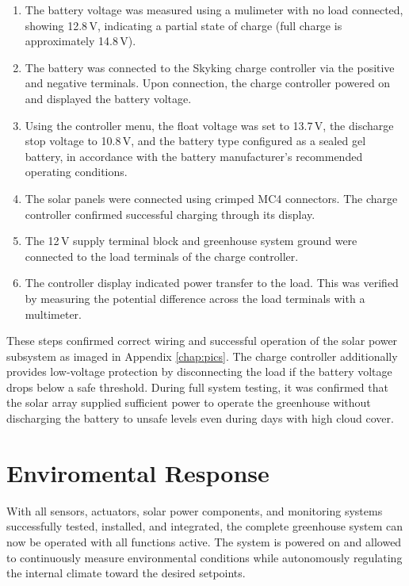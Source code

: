 \begin{enumerate}
	\item The battery voltage was measured using a mulimeter with no load connected, showing 12.8\,V, indicating a partial state of charge (full charge is approximately 14.8\,V).  
	\item The battery was connected to the Skyking charge controller via the positive and negative terminals. Upon connection, the charge controller powered on and displayed the battery voltage.  
	\item Using the controller menu, the float voltage was set to 13.7\,V, the discharge stop voltage to 10.8\,V, and the battery type configured as a sealed gel battery, in accordance with the battery manufacturer’s recommended operating conditions.  
	\item The solar panels were connected using crimped MC4 connectors. The charge controller confirmed successful charging through its display.  
	\item The 12\,V supply terminal block and greenhouse system ground were connected to the load terminals of the charge controller.  
	\item The controller display indicated power transfer to the load. This was verified by measuring the potential difference across the load terminals with a multimeter.  
\end{enumerate}

These steps confirmed correct wiring and successful operation of the solar power subsystem as imaged in Appendix \ref{chap:pics}. The charge controller additionally provides low-voltage protection by disconnecting the load if the battery voltage drops below a safe threshold. During full system testing, it was confirmed that the solar array supplied sufficient power to operate the greenhouse without discharging the battery to unsafe levels even during days with high cloud cover.

\section{Enviromental Response}\label{sec:response}

With all sensors, actuators, solar power components, and monitoring systems successfully tested, installed, and integrated, the complete greenhouse system can now be operated with all functions active. The system is powered on and allowed to continuously measure environmental conditions while autonomously regulating the internal climate toward the desired setpoints.


